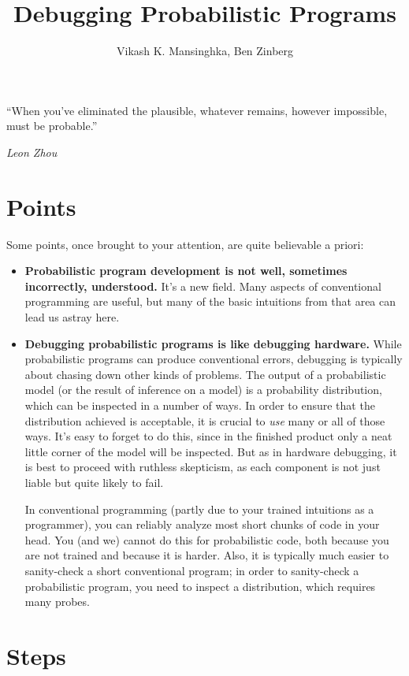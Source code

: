\documentclass[11pt]{article}
\title{Debugging Probabilistic Programs}
\author{Vikash K. Mansinghka, Ben Zinberg}
\begin{document}
\maketitle

\setlength{\epigraphwidth}{0.5\textwidth}
\epigraph{``When you've eliminated the plausible, whatever remains, however
impossible, must be probable.''}{{\itshape Leon Zhou}}

\section{Points}

Some points, once brought to your attention, are quite believable a priori:

\begin{itemize}
  \item {\bf Probabilistic program development is not well, sometimes
    incorrectly, understood.}  It's a new field.  Many aspects of conventional
    programming are useful, but many of the basic intuitions from that area can
    lead us astray here.

  \item {\bf Debugging probabilistic programs is like debugging hardware.} While
    probabilistic programs can produce conventional errors, debugging is
    typically about chasing down other kinds of problems.  The output of a
    probabilistic model (or the result of inference on a model) is a probability
    distribution, which can be inspected in a number of ways.  In order to
    ensure that the distribution achieved is acceptable, it is crucial to {\em
    use} many or all of those ways.  It's easy to forget to do this, since in
    the finished product only a neat little corner of the model will be
    inspected.  But as in hardware debugging, it is best to proceed with
    ruthless skepticism, as each component is not just liable but quite likely
    to fail.
    
    In conventional programming (partly due to your trained intuitions as a
    programmer), you can reliably analyze most short chunks of code in your
    head.  You (and we) cannot do this for probabilistic code, both because you
    are not trained and because it is harder.  Also, it is typically much easier
    to sanity-check a short conventional program; in order to sanity-check a
    probabilistic program, you need to inspect a distribution, which requires
    many probes.
\end{itemize}

\section{Steps}
\end{document}
